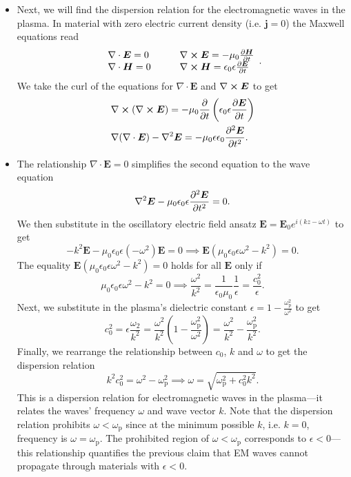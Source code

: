 \documentclass[11pt, a4paper]{article}
\renewcommand{\vec}[1]{\bm{#1}} %
\newcommand{\E}{\vec{E}}  %
\renewcommand{\H}{\vec{H}}  %
\newcommand{\e}{\epsilon}
\newcommand{\ee}{\epsilon_{0}}  %
\newcommand{\mm}{\mu_{0}}  %
\newcommand{\m}{\vec{m}}  %
\renewcommand{\div}{\nabla \cdot}
\renewcommand{\curl}{\nabla \cross}
\renewcommand{\grad}{\nabla}
\renewcommand{\laplacian}{\nabla^{2}}
\begin{document}
\begin{itemize}
	\item Next, we will find the dispersion relation for the electromagnetic waves in the plasma. In material with zero electric current density (i.e. $ \vec{j} = 0 $) the Maxwell equations read
	\[
		\begin{array}{ll}
			\div \E = 0 & \qquad \curl \E = - \mm \pdv{\H}{t}\\
			\div \H = 0 & \qquad \curl \H = \ee \e \pdv{\E}{t}
		\end{array}.
	\]
	We take the curl of the equations for $ \div \E $ and $ \curl \E $ to get
	\begin{align*}
		& \curl (\curl \E) = - \mm \pdv{t} \left(\ee \e \pdv{\E}{t}\right)\\
		& \grad (\div \E) - \laplacian \E = - \mm \e \ee \pdv[2]{\E}{t}.
	\end{align*}
	
	\item The relationship $ \div \E = 0 $ simplifies the second equation to the wave equation
	\begin{equation*}
		\laplacian \E - \mm \ee \e \pdv[2]{\E}{t} = 0.
	\end{equation*}
	We then substitute in the oscillatory electric field ansatz $ \E = \E_{0}e^{i(kz - \omega t)} $ to get
	\begin{equation*}
		- k^{2} \E - \mm \ee \e (- \omega^{2})\E = 0 \implies \E (\mm \ee \e \omega^{2} - k^{2}) = 0.
	\end{equation*}
	The equality $  \E (\mm \ee \e \omega^{2} - k^{2}) = 0 $ holds for all $ \E $ only if
	\begin{equation*}
		\mm \ee \e \omega^{2} - k^{2} = 0 \implies \frac{\omega^{2}}{k^{2}} = \frac{1}{\ee \mm} \frac{1}{\e} = \frac{c_{0}^{2}}{\e}.
	\end{equation*}
	Next, we substitute in the plasma's dielectric constant $ \e = 1 - \frac{\omega_{\mathrm{p}}^{2}}{\omega^{2}} $ to get
	\begin{equation*}
		c_{0}^{2} = \e \frac{\omega_{2}}{k^{2}} = \frac{\omega^{2}}{k^{2}}\left( 1 - \frac{\omega_{\mathrm{p}}^{2}}{\omega^{2}}\right) = \frac{\omega^{2}}{k^{2}} - \frac{\omega_{\mathrm{p}}^{2}}{k^{2}}.
	\end{equation*}
	Finally, we rearrange the relationship between $ c_{0} $, $ k $ and $ \omega $ to get the dispersion relation
	\begin{equation*}
		k^{2}c_{0}^{2} = \omega^{2} - \omega_{\mathrm{p}}^{2} \implies \omega = \sqrt{\omega_{\mathrm{p}}^{2} + c_{0}^{2}k^{2}}.
	\end{equation*}
	This is a dispersion relation for electromagnetic waves in the plasma---it relates the waves' frequency $ \omega $ and wave vector $ k $. Note that the dispersion relation prohibits $ \omega < \omega_{\mathrm{p}} $ since at the minimum possible $ k $, i.e. $ k = 0 $, frequency is $ \omega = \omega_{\mathrm{p}} $. The prohibited region of $ \omega < \omega_{\mathrm{p}} $ corresponds to $ \e < 0 $---this relationship quantifies the previous claim that EM waves cannot propagate through materials with $ \e < 0 $. 
	

\end{itemize}
\end{document}
